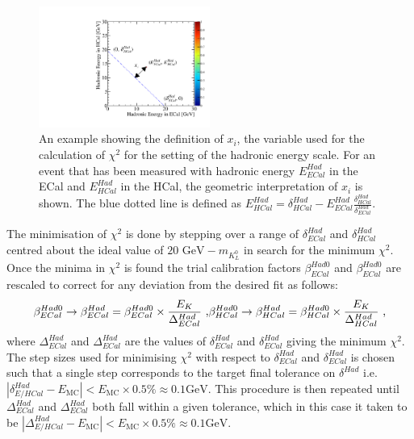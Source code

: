 \begin{figure}[h!]
\includegraphics[width=0.5\textwidth]{EnergyEstimators/Plots/Calibration/HadScaleSetting/HadScaleECalHCalSelectionExample.pdf}
\caption[An example showing the definition of $x_{i}$, the variable used for the calculation of $\chi^{2}(\delta^{Had}_{ECal}, \delta^{Had}_{HCal})$ for the setting of the hadronic energy scale.]{An example showing the definition of $x_{i}$, the variable used for the calculation of $\chi^{2}$ for the setting of the hadronic energy scale.  For an event that has been measured with hadronic energy $E^{Had}_{ECal}$ in the ECal and $E^{Had}_{HCal}$ in the HCal, the geometric interpretation of $x_{i}$ is shown.  The blue dotted line is defined as $E^{Had}_{HCal} = \delta^{Had}_{HCal} - E^{Had}_{ECal} \frac{\delta^{Had}_{HCal}}{\delta^{Had}_{ECal}}$.}
\label{fig:hadscalechi2calc}
\end{figure}

The minimisation of $\chi^{2}$ is done by stepping over a range of $\delta^{Had}_{ECal}$ and $\delta^{Had}_{HCal}$ centred about the ideal value of $20 \text { GeV} - m_{K^{0}_{L}}$ in search for the minimum $\chi^{2}$.  Once the minima in $\chi^{2}$ is found the trial calibration factors $\beta^{Had0}_{ECal}$ and $\beta^{Had0}_{ECal}$ are rescaled to correct for any deviation from the desired fit as follows:
%
\begin{equation}
\beta^{Had0}_{ECal} \rightarrow \beta^{Had}_{ECal} = \beta^{Had0}_{ECal} \times \frac{E_{K}}{\Delta^{Had}_{ECal}} \text{ ,}\\
\beta^{Had0}_{HCal} \rightarrow \beta^{Had}_{HCal} = \beta^{Had0}_{HCal} \times \frac{E_{K}}{\Delta^{Had}_{HCal}}\text{ ,}
\end{equation}
%
\noindent where $\Delta^{Had}_{ECal}$ and $\Delta^{Had}_{ECal}$ are the values of $\delta^{Had}_{ECal}$ and $\delta^{Had}_{ECal}$ giving the minimum $\chi^{2}$.  The step sizes used for minimising $\chi^{2}$ with respect to $\delta^{Had}_{ECal}$ and $\delta^{Had}_{ECal}$ is chosen such that a single step corresponds to the target final tolerance on $\delta^{Had}$ i.e. $|\delta^{Had}_{E/HCal} - E_{\text{MC}}| < E_{\text{MC}} \times 0.5 \% \approx 0.1 \text{GeV}$.  This procedure is then repeated until $\Delta^{Had}_{ECal}$ and $\Delta^{Had}_{ECal}$ both fall within a given tolerance, which in this case it taken to be $|\Delta^{Had}_{E/HCal} - E_{\text{MC}}| < E_{\text{MC}} \times 0.5 \% \approx 0.1 \text{GeV}$.

